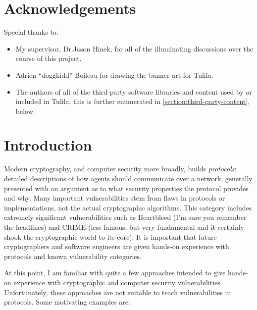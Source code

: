 \documentclass[12pt]{article}
\begin{document}
\newpage

\section*{Acknowledgements}

Special thanks to:
\begin{itemize}
  \item My supervisor, Dr.\@ Jason Hinek, for all of the illuminating discussions over the course of this project.
  \item Adrien ``doggkidd'' Boileau for drawing the banner art for Tulila.
  \item The authors of all of the third-party software libraries and content used by or included in Tulila; this is further enumerated in \cref{section:third-party-content}, below.
\end{itemize}

\newpage

\tableofcontents
\newpage



\section{Introduction}


Modern cryptography, and computer security more broadly, builds \textit{protocols}: detailed descriptions of how agents should communicate over a network, generally presented with an argument as to what security properties the protocol provides and why. Many important vulnerabilities stem from flaws in protocols or implementations, not the actual cryptographic algorithms. This category includes extremely significant vulnerabilities such as Heartbleed (I'm sure you remember the headlines) and CRIME (less famous, but very fundamental and it certainly shook the cryptographic world to its core). It is important that future cryptographers and software engineers are given hands-on experience with protocols and known vulnerability categories.

At this point, I am familiar with quite a few approaches intended to give hands-on experience with cryptographic and computer security vulnerabilities. Unfortunately, these approaches are not suitable to teach vulnerabilities in protocols. Some motivating examples are:
\end{document}

